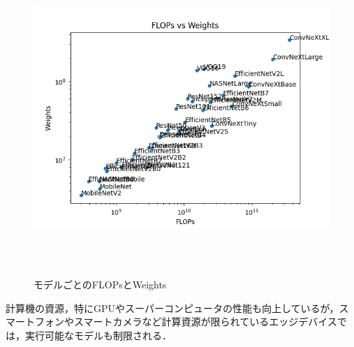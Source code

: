 \begin{figure} [H]
	\begin{center}
		\includegraphics[clip, height=12cm, bb=-60 0 640 480]{data/figure/models_info.png}
		\caption{モデルごとのFLOPsとWeights}
		\label{flops_vs_weights}
	\end{center}
\end{figure}


計算機の資源，特にGPUやスーパーコンピュータの性能も向上しているが，スマートフォンやスマートカメラなど計算資源が限られているエッジデバイスでは，実行可能なモデルも制限される．

